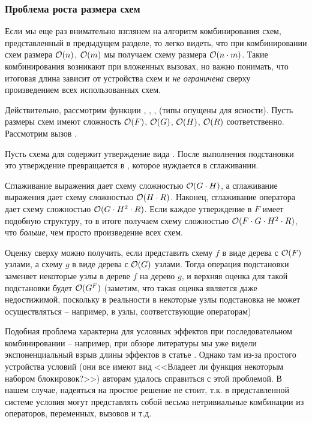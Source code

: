 \subsubsection{Проблема роста размера схем}

Если мы еще раз внимательно взглянем на алгоритм комбинирования схем, представленный в предыдущем разделе, то легко видеть, что при комбинировании схем размера $\mathcal{O}(n)$, $\mathcal{O}(m)$ мы получаем схему размера $\mathcal{O}(n \cdot m)$. Такие комбинирования возникают при вложенных вызовах, но важно понимать, что итоговая длина зависит от устройства схем и \emph{не ограничена} сверху произведением всех использованных схем. 

Действительно, рассмотрим функции , , ,  (типы опущены для ясности). Пусть размеры схем имеют сложность $\mathcal{O}(F)$, $\mathcal{O}(G)$, $\mathcal{O}(H)$, $\mathcal{O}(R)$ соответственно. Рассмотрим вызов . 

Пусть схема для  содержит утверждение вида . После выполнения подстановки это утверждение превращается в , которое нуждается в сглаживании. 

Сглаживание выражения  дает схему сложностью $\mathcal{O}(G \cdot H)$, а сглаживание выражения  дает схему сложностью $\mathcal{O}(H \cdot R)$. Наконец, сглаживание оператора \code{==} дает схему сложностью $\mathcal{O}(G \cdot H^2 \cdot R)$. Если каждое утверждение в $F$ имеет подобную структуру, то в итоге получаем схему сложностью $\mathcal{O}(F \cdot G \cdot H^2 \cdot R)$, что \emph{больше}, чем просто произведение всех схем.

Оценку сверху можно получить, если представить схему $f$ в виде дерева с $\mathcal{O}(F)$ узлами, а схему $g$ в виде дерева с $\mathcal{O}(G)$ узлами. Тогда операция подстановки заменяет некоторые узлы в дереве $f$ на дерево $g$, и верхняя оценка для такой подстановки будет $\mathcal{O}(G^F)$ (заметим, что такая оценка является даже недостижимой, поскольку в реальности в некоторые узлы подстановка не может осуществляться -- например, в узлы, соответствующие операторам)

Подобная проблема характерна для условных эффектов при последовательном комбинировании -- например, при обзоре литературы мы уже видели экспоненциальный взрыв длины эффектов в статье  \cite{Flanagan08}. Однако там из-за простого устройства условий (они все имеют вид <<Владеет ли функция некоторым набором блокировок?>>) авторам удалось справиться с этой проблемой. В нашем случае, надеяться на простое решение не стоит, т.к. в представленной системе условия могут представлять собой весьма нетривиальные комбинации из операторов, переменных, вызовов и т.д.

